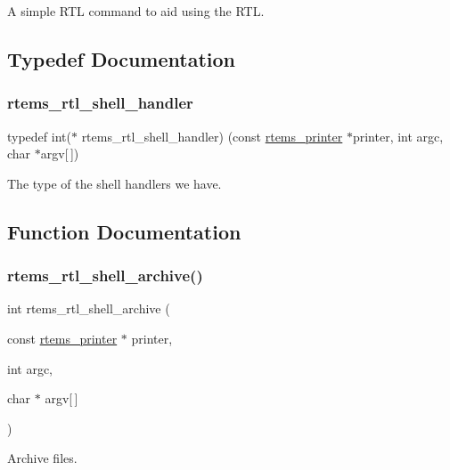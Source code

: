 A simple R\+TL command to aid using the R\+TL. 

\subsection{Typedef Documentation}
\mbox{\label{rtl-shell_8c_abdb8a1e1d10a86732342e0157986f7ff}} 
\subsubsection{\texorpdfstring{rtems\_rtl\_shell\_handler}{rtems\_rtl\_shell\_handler}}
{\footnotesize\ttfamily typedef int($\ast$ rtems\+\_\+rtl\+\_\+shell\+\_\+handler) (const \mbox{\hyperlink{structrtems__printer}{rtems\+\_\+printer}} $\ast$printer, int argc, char $\ast$argv\mbox{[}$\,$\mbox{]})}

The type of the shell handlers we have. 

\subsection{Function Documentation}
\mbox{\label{rtl-shell_8c_a6d62d1191b9362ec04fc2305eea21280}} 
\subsubsection{\texorpdfstring{rtems\_rtl\_shell\_archive()}{rtems\_rtl\_shell\_archive()}}
{\footnotesize\ttfamily int rtems\+\_\+rtl\+\_\+shell\+\_\+archive (\begin{DoxyParamCaption}\item[{const \mbox{\hyperlink{structrtems__printer}{rtems\+\_\+printer}} $\ast$}]{printer,  }\item[{int}]{argc,  }\item[{char $\ast$}]{argv\mbox{[}$\,$\mbox{]} }\end{DoxyParamCaption})}

Archive files. \mbox{\label{rtl-shell_8c_a80ea92b004f787087876764852d994fd}} 
